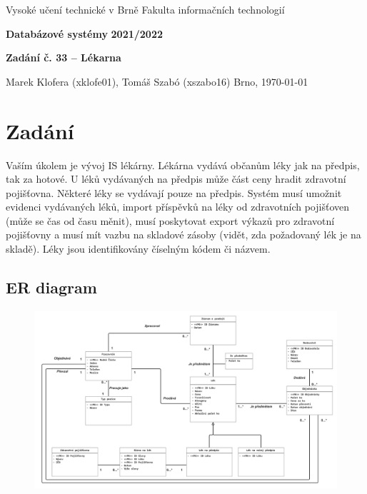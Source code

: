 \documentclass[10pt,a4paper]{article}
\begin{document}
    \pagestyle{empty}
    \begin{titlepage}
        \begin{center}
            \large\normalsize{Vysoké učení technické v Brně\linebreak}
            \large\normalsize{Fakulta informačních technologií}

            \vfill
            
            \Large\textbf{Databázové systémy\linebreak}
            \Large\textbf{2021/2022}

            \vfill

            \LARGE\textbf{Zadání č. 33 – Lékarna\linebreak}

            \vfill
            \vfill
            \vfill


            \large{Marek Klofera (xklofe01), Tomáš Szabó (xszabo16) \hfill Brno, \today}
            
        \end{center}
    \end{titlepage}
    \pagestyle{plain}
    \newpage

    \tableofcontents
    \newpage

\section{Zadání}
        Vaším úkolem je vývoj IS lékárny. Lékárna vydává občanům léky jak na předpis, tak za hotové. U léků vydávaných na předpis může část ceny hradit zdravotní pojišťovna. Některé léky se vydávají pouze na předpis. Systém musí umožnit evidenci vydávaných léků, import příspěvků na léky od zdravotních pojišťoven (může se čas od času měnit), musí poskytovat export výkazů pro zdravotní pojišťovny a musí mít vazbu na skladové zásoby (vidět, zda požadovaný lék je na skladě). Léky jsou identifikovány číselným kódem či názvem.
        
    \newpage
        \subsection{ER diagram}
            \begin{figure}[H]
                \centering
                \includegraphics[scale=0.08]{img/ER.jpg}
                \label{fig:my_label}
            \end{figure}
            
\end{document}
